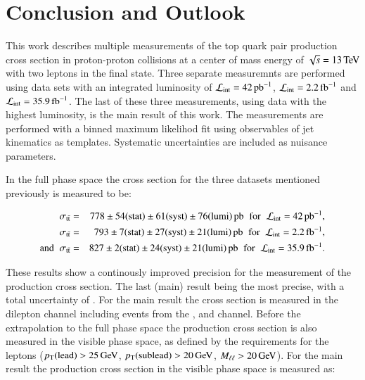 
\chapter{Conclusion and Outlook}
\label{sec:out}

This work describes multiple measurements of the top quark pair production cross section in proton-proton collisions at a center of mass energy of $\sqrt{s}=13 \,\text{Te\hspace{-.08em}V}$ with two leptons in the final state.
Three separate measuremnts are performed using data sets with an integrated luminosity of $\mathcal{L}_{\mathrm{int}}= 42 \mbox{\ensuremath{\,\text{pb}^\text{$-$1}}}$, $\mathcal{L}_{\mathrm{int}}= 2.2 \mbox{\ensuremath{\,\text{fb}^\text{$-$1}}}$ and $\mathcal{L}_{\mathrm{int}}= 35.9 \mbox{\ensuremath{\,\text{fb}^\text{$-$1}}}$.
The last of these three measurements, using data with the highest luminosity, is the main result of this work.
The measurements are performed with a binned maximum likelihod fit using observables of jet kinematics as templates. 
Systematic uncertainties are included as nuisance parameters.

In the full phase space the cross section for the three datasets mentioned previously is measured to be:

\begin{eqnarray*}
\sigma_{\mathrm{t}\bar{\mathrm{t}}} & = & 778 \pm  54 ({\rm stat}) \pm 61 ({\rm syst}) \pm 76 ({\rm lumi}) \mbox{\ensuremath{\,\text{pb}}} \hspace{0.2cm}  \mathrm{for} \; \;  \mathcal{L}_{\mathrm{int}}= 42 \mbox{\ensuremath{\,\text{pb}^\text{$-$1}}}, \\
\sigma_{\mathrm{t}\bar{\mathrm{t}}} & = & 793 \pm  7 ({\rm stat}) \pm 27 ({\rm syst}) \pm 21 ({\rm lumi}) \mbox{\ensuremath{\,\text{pb}}}  \hspace{0.2cm}  \mathrm{for} \;\; \mathcal{L}_{\mathrm{int}}= 2.2 \mbox{\ensuremath{\,\text{fb}^\text{$-$1}}}, \\
\mathrm{and} \; \; \sigma_{\mathrm{t}\bar{\mathrm{t}}} & = & 827 \pm 2 ({\rm stat}) \pm 24 ({\rm syst}) \pm 21 ({\rm lumi}) \mbox{\ensuremath{\,\text{pb}}} \hspace{0.2cm}  \mathrm{for} \;\; \mathcal{L}_{\mathrm{int}}= 35.9 \mbox{\ensuremath{\,\text{fb}^\text{$-$1}}}.
\end{eqnarray*} 

These results show a continously improved precision for the measurement of the \ttbar production cross section. The last (main) result being the most precise, with a total uncertainty of \uncertaintytotmain. 
For the main result the \ttbar cross section  is measured in the dilepton channel including events from the \emu, \mumu and \ee channel.
Before the extrapolation to the full phase space the \ttbar production cross section is also measured in the visible phase space, as defined by the requirements for the leptons ($p_{\mathrm{T}}(\mathrm{lead}) > 25 \,\text{Ge\hspace{-.08em}V}$, $p_{\mathrm{T}}(\mathrm{sublead}) > 20 \,\text{Ge\hspace{-.08em}V}$, $M_{\ell\ell} > 20 \,\text{Ge\hspace{-.08em}V}$).
For the main result the \ttbar production cross section in the visible phase space is measured as:


